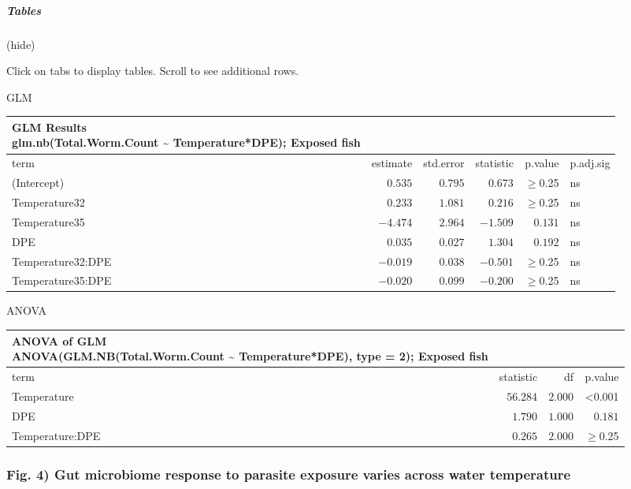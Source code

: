 \documentclass[
]{article}
\begin{document}
\subparagraph{Tables}\label{tables-6}

(hide)

Click on tabs to display tables. Scroll to see additional rows.

GLM

\begin{longtable}{lrrrrl}
\caption*{
{\large GLM Results} \\ 
{\small glm.nb(Total.Worm.Count \textasciitilde{} Temperature*DPE); Exposed fish}
} \\ 
\toprule
term & estimate & std.error & statistic & p.value & p.adj.sig \\ 
\midrule\addlinespace[2.5pt]
(Intercept) & $0.535$ & $0.795$ & $0.673$ & $\geq$0.25 & ns \\ 
Temperature32 & $0.233$ & $1.081$ & $0.216$ & $\geq$0.25 & ns \\ 
Temperature35 & $-4.474$ & $2.964$ & $-1.509$ & $0.131$ & ns \\ 
DPE & $0.035$ & $0.027$ & $1.304$ & $0.192$ & ns \\ 
Temperature32:DPE & $-0.019$ & $0.038$ & $-0.501$ & $\geq$0.25 & ns \\ 
Temperature35:DPE & $-0.020$ & $0.099$ & $-0.200$ & $\geq$0.25 & ns \\ 
\bottomrule
\end{longtable}

ANOVA

\begin{longtable}{lrrr}
\caption*{
{\large ANOVA of GLM} \\ 
{\small ANOVA(GLM.NB(Total.Worm.Count \textasciitilde{} Temperature*DPE), type = 2); Exposed fish}
} \\ 
\toprule
term & statistic & df & p.value \\ 
\midrule\addlinespace[2.5pt]
Temperature & $56.284$ & $2.000$ & <0.001 \\ 
DPE & $1.790$ & $1.000$ & $0.181$ \\ 
Temperature:DPE & $0.265$ & $2.000$ & $\geq$0.25 \\ 
\bottomrule
\end{longtable}

\subsubsection{Fig. 4) Gut microbiome response to parasite exposure
varies across water
temperature}\label{fig.-4-gut-microbiome-response-to-parasite-exposure-varies-across-water-temperature}
\end{document}
